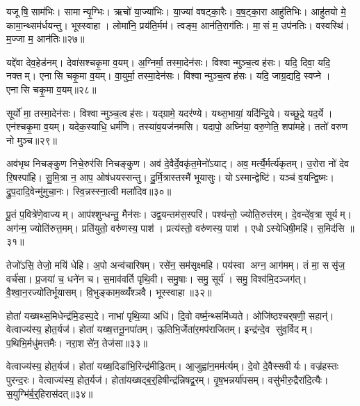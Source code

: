 यजूषि॒ साम॑भिः। सामान्यृ॒ग्भिः। ऋचो॑ या॒ज्या॑भिः। या॒ज्या॑ वषट्का॒रैः। व॒ष॒ट्का॒रा आहु॑तिभिः। आहु॑तयो मे॒ कामा॒न्थ्सम॑र्धयन्तु। भूस्स्वाहा। लोमा॑नि॒ प्रय॑ति॒र्मम॑। त्वङ्म॒ आन॑ति॒राग॑तिः। मा॒सं म॒ उप॑नतिः। वस्वस्थि॑। म॒ज्जा म॒ आन॑तिः॥२७॥\anuvakamend[प॒स्त्यास्वा सर॑स्वत्यै॒ भैष॑ज्येन॒ श्रीरङ्गा॑नि भ॒सद्य॒ज्ञे य॒ज्ञो यजु॑र्भि॒रुप॑नति॒र्द्वे च॑]

यद्दे॑वा देव॒हेड॑नम्। देवा॑सश्चकृ॒मा व॒यम्। अ॒ग्निर्मा॒ तस्मा॒देन॑सः। विश्वान्मुञ्च॒त्वह॑सः। यदि॒ दिवा॒ यदि॒ नक्तम्। एनासि चकृ॒मा व॒यम्। वा॒युर्मा॒ तस्मा॒देन॑सः। विश्वान्मुञ्च॒त्वह॑सः। यदि॒ जाग्र॒द्यदि॒ स्वप्ने। एनासि चकृ॒मा व॒यम्॥२८॥

सूर्यो॑ मा॒ तस्मा॒देन॑सः। विश्वान्मुञ्च॒त्वह॑सः। यद्ग्रामे॒ यदर॑ण्ये। यथ्स॒भायां॒ यदि॑न्द्रि॒ये। यच्छू॒द्रे यद॒र्ये। एन॑श्चकृ॒मा व॒यम्। यदेक॒स्याधि॒ धर्म॑णि। तस्या॑व॒यज॑नमसि। यदापो॒ अघ्नि॑या॒ वरु॒णेति॒ शपा॑महे। ततो॑ वरुण नो मुञ्च॥२९॥

अव॑भृथ निचङ्कुण निचे॒रुर॑सि निचङ्कुण। अव॑ दे॒वैर्दे॒वकृ॑त॒मेनो॑ऽयाट्। अव॒ मर्त्यै॒र्मर्त्य॑कृतम्। उ॒रोरा नो॑ देव रि॒षस्पा॑हि। सु॒मि॒त्रा न॒ आप॒ ओष॑धयस्सन्तु। दु॒र्मि॒त्रास्तस्मै॑ भूयासुः। योऽस्मान्द्वेष्टि॑। यञ्च॑ व॒यन्द्वि॒ष्मः। द्रु॒प॒दादि॒वेन्मु॑मुचा॒नः। स्वि॒न्नस्स्ना॒त्वी मला॑दिव॥३०॥

पू॒तं प॒वित्रे॑णे॒वाज्यम्। आप॑श्शुन्धन्तु॒ मैन॑सः। उद्व॒यन्तम॑स॒स्परि॑। पश्य॑न्तो॒ ज्योति॒रुत्त॑रम्। दे॒वन्दे॑व॒त्रा सूर्यम्। अग॑न्म॒ ज्योति॑रुत्त॒मम्। प्रति॑युतो॒ वरु॑णस्य॒ पाश॑। प्रत्य॑स्तो॒ वरु॑णस्य॒ पाश॑। एधोऽस्येधिषी॒महि॑। स॒मिद॑सि ॥३१॥

तेजो॑ऽसि॒ तेजो॒ मयि॑ धेहि। अ॒पो अन्व॑चारिषम्। रसे॑न॒ सम॑सृक्ष्महि। पय॑स्वा अग्न॒ आग॑मम्। तं मा॒ ससृ॑ज॒ वर्च॑सा। प्र॒जया॑ च॒ धने॑न च। स॒माव॑वर्ति पृथि॒वी। समु॒षाः। समु॒ सूर्य॑। समु॒ विश्व॑मि॒दञ्जग॑त्। वै॒श्वा॒न॒रज्यो॑तिर्भूयासम्। वि॒भुङ्काम॒व्व्यँ॑श्ञवै। भूस्स्वाहा॥३२॥\anuvakamend[स्वप्न॒ एनासि चकृ॒मा व॒यं मु॑ञ्च॒ मला॑दिव स॒मिद॑सि॒ जग॒त्रीणि॑ च]

होता॑ यख्षथ्स॒मिधेन्द्र॑मि॒डस्प॒दे। नाभा॑ पृथि॒व्या अधि॑। दि॒वो वर्ष्म॒न्थ्समि॑ध्यते। ओजि॑ष्ठश्चर्‌षणी॒ सहान्॑। वेत्वाज्य॑स्य॒ होत॒र्यज॑। होता॑ यख्ष॒त्तनू॒नपा॑तम्। ऊ॒तिभि॒र्जेता॑र॒मप॑राजितम्। इन्द्र॑न्दे॒व सु॑व॒र्विदम्। प॒थिभि॒र्मधु॑मत्तमैः। नरा॒शसे॑न॒ तेज॑सा॥३३॥

वेत्वाज्य॑स्य॒ होत॒र्यज॑। होता॑ यख्ष॒दिडा॑भि॒रिन्द्र॑मीडि॒तम्। आ॒जुह्वा॑न॒मम॑र्त्यम्। दे॒वो दे॒वैस्सवीर्यः। वज्र॑हस्तः पुरन्द॒रः। वेत्वाज्य॑स्य॒ होत॒र्यज॑। होता॑यख्षद्ब॒र्॒हिषीन्द्र॑न्निषद्व॒रम्। वृ॒ष॒भन्नर्या॑पसम्। वसु॑भीरु॒द्रैरा॑दि॒त्यैः। स॒युग्भि॑र्ब॒र्॒हिरास॑दत्॥३४॥

